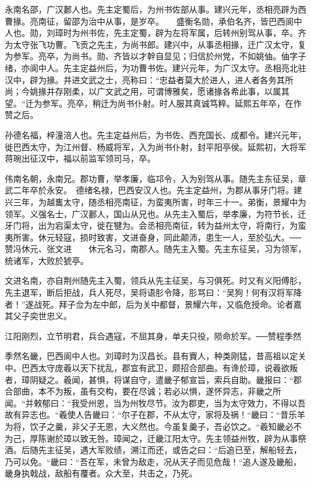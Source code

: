 \documentclass[12pt,UTF8]{ctexbook}
\begin{document}
永南名邵，广汉郪人也。先主定蜀后，为州书佐部从事。建兴元年，丞相亮辟为西曹掾。亮南征，留邵为治中从事，是岁卒。　　盛衡名勋，承伯名齐，皆巴西阆中人也。勋，刘璋时为州书佐，先主定蜀，辟为左将军属，后转州别驾从事，卒。齐为太守张飞功曹。飞贡之先主，为尚书郎。建兴中，从事丞相掾，迁广汉太守，复为参军。亮卒，为尚书。勋、齐皆以才幹自显见；归信於州党，不如姚伷。伷字子绪，亦阆中人。先主定益州后，为功曹书佐。建兴元年，为广汉太守。丞相亮北驻汉中，辟为掾。并进文武之士，亮称曰：“忠益者莫大於进人，进人者各务其所尚；今姚掾并存刚柔，以广文武之用，可谓博雅矣，愿诸掾各希此事，以属其望。“迁为参军。亮卒，稍迁为尚书仆射。时人服其真诚笃粹。延熙五年卒，在作赞之后。

孙德名福，梓潼涪人也。先主定益州后，为书佐、西充国长、成都令。建兴元年，徙巴西太守，为江州督、杨威将军，入为尚书仆射，封平阳亭侯。延熙初，大将军蒋琬出征汉中，福以前监军领司马，卒。

伟南名朝，永南兄。郡功曹，举孝廉，临邛令，入为别驾从事。随先主东征吴，章武二年卒於永安。　德绪名禄，巴西安汉人也。先主定益州，为郡从事牙门将。建兴三年，为越巂太守，随丞相亮南征，为蛮夷所害，时年三十一。弟衡，景耀中为领军。义强名士，广汉郪人，国山从兄也。从先主入蜀后，举孝廉，为符节长，迁牙门将，出为宕渠太守，徙在犍为。会丞相亮南征，转为益州太守，将南行，为蛮夷所害。休元轻寇，损时致害，文进奋身，同此颠沛，患生一人，至於弘大。──赞冯休元、张文进　　休元名习，南郡人。随先主入蜀。先主东征吴，习为领军，统诸军，大败於猇亭。

文进名南，亦自荆州随先主入蜀，领兵从先主征吴，与习俱死。时又有义阳傅肜，先主退军，断后拒战，兵人死尽，吴将语肜令降，肜骂曰：“吴狗！何有汉将军降者！”遂战死。拜子佥为左中郎，后为关中都督，景耀六年，又临危授命。论者嘉其父子奕世忠义。

江阳刚烈，立节明君，兵合遇寇，不屈其身，单夫只役，陨命於军。──赞程季然

季然名畿，巴西阆中人也。刘璋时为汉昌长。县有賨人，种类刚猛，昔高祖以定关中。巴西太守庞羲以天下扰乱，郡宜有武卫，颇招合部曲。有谗於璋，说羲欲叛者，璋阴疑之。羲闻，甚惧，将谋自守，遣畿子郁宣旨，索兵自助。畿报曰：“郡合部曲，本不为叛，虽有交构，要在尽诚；若必以惧，遂怀异志，非畿之所闻。“并敕郁曰：“我受州恩，当为州牧尽节。汝为郡吏，当为太守效力，不得以吾故有异志也。“羲使人告畿曰：“尔子在郡，不从太守，家将及祸！“畿曰：“昔乐羊为将，饮子之羹，非父子无恩，大义然也。今虽复羹子，吾必饮之。“羲知畿必不为己，厚陈谢於璋以致无咎。璋闻之，迁畿江阳太守。先主领益州牧，辟为从事祭酒。后随先主征吴，遇大军败绩，溯江而还，或告之曰：“后追已至，解船轻去，乃可以免。“畿曰：“吾在军，未曾为敌走，况从天子而见危哉！“追人遂及畿船，畿身执戟战，敌船有覆者。众大至，共击之，乃死。
\end{document}
